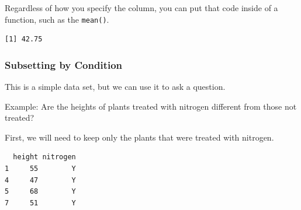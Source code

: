 \documentclass[
  letterpaper,
  DIV=11,
  numbers=noendperiod]{scrartcl}
\newenvironment{Shaded}{\begin{snugshade}}{\end{snugshade}}
\newcommand{\CommentTok}[1]{\textcolor[rgb]{0.37,0.37,0.37}{#1}}
\newcommand{\DecValTok}[1]{\textcolor[rgb]{0.68,0.00,0.00}{#1}}
\newcommand{\FunctionTok}[1]{\textcolor[rgb]{0.28,0.35,0.67}{#1}}
\newcommand{\NormalTok}[1]{\textcolor[rgb]{0.00,0.23,0.31}{#1}}
\newcommand{\SpecialCharTok}[1]{\textcolor[rgb]{0.37,0.37,0.37}{#1}}
\newcommand{\StringTok}[1]{\textcolor[rgb]{0.13,0.47,0.30}{#1}}
\begin{document}
\begin{Shaded}
\end{Shaded}

Regardless of how you specify the column, you can put that code inside
of a function, such as the \texttt{mean()}.

\begin{Shaded}
\end{Shaded}

\begin{verbatim}
[1] 42.75
\end{verbatim}

\subsubsection{Subsetting by Condition}\label{subsetting-by-condition-1}

This is a simple data set, but we can use it to ask a question.

Example: Are the heights of plants treated with nitrogen different from
those not treated?

First, we will need to keep only the plants that were treated with
nitrogen.

\begin{Shaded}
\end{Shaded}

\begin{verbatim}
  height nitrogen
1     55        Y
4     47        Y
5     68        Y
7     51        Y
\end{verbatim}

\begin{Shaded}
\end{Shaded}
\end{document}
